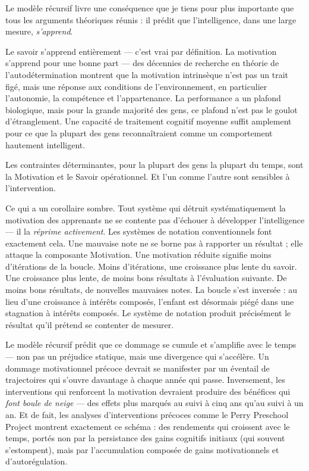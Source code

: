 \documentclass[11pt, twoside, openright]{book}
\begin{document}
Le modèle récursif livre une conséquence que je tiens pour plus importante que tous les arguments théoriques réunis : il prédit que l'intelligence, dans une large mesure, \textit{s'apprend}.

Le savoir s'apprend entièrement --- c'est vrai par définition. La motivation s'apprend pour une bonne part --- des décennies de recherche en théorie de l'autodétermination montrent que la motivation intrinsèque n'est pas un trait figé, mais une réponse aux conditions de l'environnement, en particulier l'autonomie, la compétence et l'appartenance. La performance a un plafond biologique, mais pour la grande majorité des gens, ce plafond n'est pas le goulot d'étranglement. Une capacité de traitement cognitif moyenne suffit amplement pour ce que la plupart des gens reconnaîtraient comme un comportement hautement intelligent.

Les contraintes déterminantes, pour la plupart des gens la plupart du temps, sont la Motivation et le Savoir opérationnel. Et l'un comme l'autre sont sensibles à l'intervention.

Ce qui a un corollaire sombre. Tout système qui détruit systématiquement la motivation des apprenants ne se contente pas d'échouer à développer l'intelligence --- il la \textit{réprime activement}. Les systèmes de notation conventionnels font exactement cela. Une mauvaise note ne se borne pas à rapporter un résultat ; elle attaque la composante Motivation. Une motivation réduite signifie moins d'itérations de la boucle. Moins d'itérations, une croissance plus lente du savoir. Une croissance plus lente, de moins bons résultats à l'évaluation suivante. De moins bons résultats, de nouvelles mauvaises notes. La boucle s'est inversée : au lieu d'une croissance à intérêts composés, l'enfant est désormais piégé dans une stagnation à intérêts composés. Le système de notation produit précisément le résultat qu'il prétend se contenter de mesurer.

Le modèle récursif prédit que ce dommage se cumule et s'amplifie avec le temps --- non pas un préjudice statique, mais une divergence qui s'accélère. Un dommage motivationnel précoce devrait se manifester par un éventail de trajectoires qui s'ouvre davantage à chaque année qui passe. Inversement, les interventions qui renforcent la motivation devraient produire des bénéfices qui \textit{font boule de neige} --- des effets plus marqués au suivi à cinq ans qu'au suivi à un an. Et de fait, les analyses d'interventions précoces comme le Perry Preschool Project montrent exactement ce schéma : des rendements qui croissent avec le temps, portés non par la persistance des gains cognitifs initiaux (qui souvent s'estompent), mais par l'accumulation composée de gains motivationnels et d'autorégulation.
\end{document}
